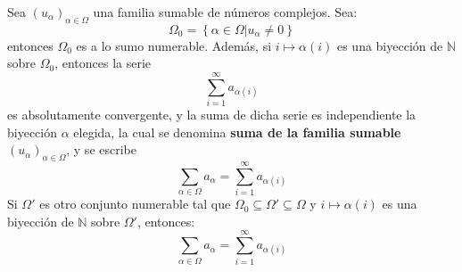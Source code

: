 \documentclass[12pt]{report}
\theoremstyle{largebreak}
\begin{document}
    \begin{propo}
        Sea $\left(u_\alpha \right)_{\alpha\in\Omega}$ una familia sumable de números complejos. Sea:
        \begin{equation*}
            \Omega_0=\left\{\alpha\in\Omega\Big|u_\alpha\neq0 \right\}
        \end{equation*}
        entonces $\Omega_0$ es a lo sumo numerable. Además, si $i\mapsto\alpha(i)$ es una biyección de $\mathbb{N}$ sobre $\Omega_0$, entonces la serie
        \begin{equation*}
            \sum_{i=1 }^{\infty}a_{\alpha(i)}
        \end{equation*}
        es absolutamente convergente, y la suma de dicha serie es independiente la biyección $\alpha$ elegida, la cual se denomina \textbf{suma de la familia sumable $\left(u_\alpha \right)_{\alpha\in\Omega}$}, y se escribe
        \begin{equation*}
            \sum_{\alpha\in\Omega }a_\alpha=\sum_{i=1 }^{\infty}a_{\alpha(i)}
        \end{equation*}
        Si $\Omega'$ es otro conjunto numerable tal que $\Omega_0\subseteq\Omega'\subseteq\Omega$ y $i\mapsto\alpha(i)$ es una biyección de $\mathbb{N}$ sobre $\Omega'$, entonces:
        \begin{equation*}
            \sum_{\alpha\in\Omega }a_\alpha=\sum_{i=1 }^{\infty}a_{\alpha(i)}
        \end{equation*}
    \end{propo}
\end{document}
